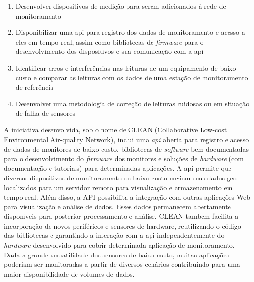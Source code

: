 \begin{enumerate}
    \item Desenvolver dispositivos de medição para serem adicionados à rede de monitoramento
    \item Disponibilizar uma \acrshort{api} para registro dos dados de monitoramento e acesso a eles em tempo real, assim como bibliotecas de \textit{firmware} para o desenvolvimento dos dispositivos e sua comunicação com a \acrshort{api}
    \item Identificar erros e interferências nas leituras de um equipamento de baixo custo e comparar as leituras com os dados de uma estação de monitoramento de referência
    \item Desenvolver uma metodologia de correção de leituras ruidosas ou em situação de falha de sensores
\end{enumerate}

A iniciativa desenvolvida, sob o nome de CLEAN (Collaborative Low-cost Environmental Air-quality Network), inclui uma \textit{api} aberta para registro e acesso de dados de monitores de baixo custo, bibliotecas de \textit{software} bem documentadas para o desenvolvimento do \textit{firmware} dos monitores e soluções de \textit{hardware} (com documentação e tutoriais) para determinadas aplicações. A \acrshort{api} permite que diversos dispositivos de monitoramento de baixo custo enviem seus dados geo-localizados para um servidor remoto para visualização e armazenamento em tempo real. Além disso, a API possibilita a integração com outras aplicações Web para visualização e análise de dados. Esses dados permanecem abertamente disponíveis para posterior processamento e análise. CLEAN também facilita a incorporação de novos periféricos e sensores de hardware, reutilizando o código das bibliotecas e garantindo a interação com a \acrshort{api} independentemente do \textit{hardware} desenvolvido para cobrir determinada aplicação de monitoramento. Dada a grande versatilidade dos sensores de baixo custo, muitas aplicações poderiam ser monitoradas a partir de diversos cenários contribuindo para uma maior disponibilidade de volumes de dados.

